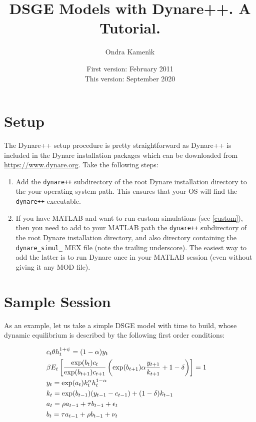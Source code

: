 \documentclass[10pt]{article}
\begin{document}
\title{DSGE Models with Dynare++. A Tutorial.}

\author{Ondra Kamen\'\i k}

\date{First version: February 2011 \\ This version: September 2020}
\maketitle

\tableofcontents

\section{Setup}

The Dynare++ setup procedure is pretty straightforward as Dynare++ is included in the Dynare installation 
packages which can be downloaded from \url{https://www.dynare.org}. Take the following steps:
\begin{enumerate}
\item Add the {\tt dynare++} subdirectory of the root Dynare installation directory to the your
operating system path. This ensures that your OS will find the {\tt dynare++} executable.
\item If you have MATLAB and want to run custom simulations (see \ref{custom}),
  then you need to add to your MATLAB path the {\tt dynare++} subdirectory of
  the root Dynare installation directory, and also directory containing the
  \texttt{dynare\_simul\_} MEX file (note the trailing underscore). The easiest
  way to add the latter is to run Dynare once in your MATLAB session (even
  without giving it any MOD file).
\end{enumerate}

\section{Sample Session}

As an example, let us take a simple DSGE model with time to build, whose dynamic
equilibrium is described by the following first order conditions:

\begin{align*}
&c_t\theta h_t^{1+\psi} = (1-\alpha)y_t\cr
&\beta E_t\left[\frac{\exp(b_t)c_t}{\exp(b_{t+1})c_{t+1}}
\left(\exp(b_{t+1})\alpha\frac{y_{t+1}}{k_{t+1}}+1-\delta\right)\right]=1\cr
&y_t=\exp(a_t)k_t^\alpha h_t^{1-\alpha}\cr
&k_{t}=\exp(b_{t-1})(y_{t-1}-c_{t-1})+(1-\delta)k_{t-1}\cr
&a_t=\rho a_{t-1}+\tau b_{t-1}+\epsilon_t\cr
&b_t=\tau a_{t-1}+\rho b_{t-1}+\nu_t
\end{align*}
\end{document}
